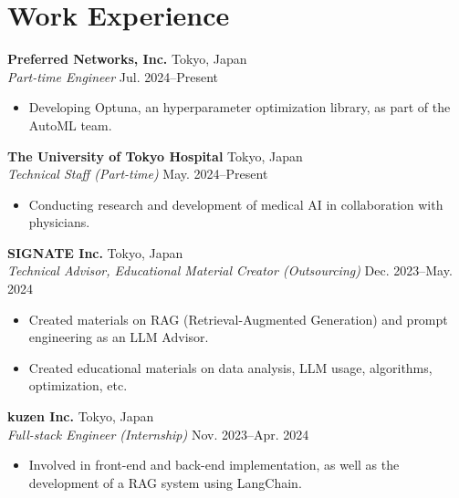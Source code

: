 \documentclass{article}
\begin{document}
\section{Work Experience}

\textbf{Preferred Networks, Inc.}
\hspace{\fill}Tokyo, Japan\\
\textit{Part-time Engineer}
\hspace{\fill}Jul. 2024--Present
\begin{itemize}[parsep=0pt, after=\vspace{5pt}]
  \item Developing Optuna, an hyperparameter optimization library, as part of the AutoML team.
\end{itemize}

\textbf{The University of Tokyo Hospital}
\hspace{\fill}Tokyo, Japan\\
\textit{Technical Staff (Part-time)}
\hspace{\fill}May. 2024--Present
\begin{itemize}[parsep=0pt, after=\vspace{5pt}]
  \item Conducting research and development of medical AI in collaboration with physicians.
\end{itemize}

\textbf{SIGNATE Inc.}
\hspace{\fill}Tokyo, Japan\\
\textit{Technical Advisor, Educational Material Creator (Outsourcing)}
\hspace{\fill}Dec. 2023--May. 2024
\begin{itemize}[parsep=0pt, after=\vspace{5pt}]
  \item Created materials on RAG (Retrieval-Augmented Generation) and prompt engineering as an LLM Advisor.
  \item Created educational materials on data analysis, LLM usage, algorithms, optimization, etc.
\end{itemize}

\textbf{kuzen Inc.}
\hspace{\fill}Tokyo, Japan\\
\textit{Full-stack Engineer (Internship)}
\hspace{\fill}Nov. 2023--Apr. 2024
\begin{itemize}[parsep=0pt, after=\vspace{5pt}]
  \item Involved in front-end and back-end implementation, as well as the development of a RAG system using LangChain.
\end{itemize}
\end{document}
